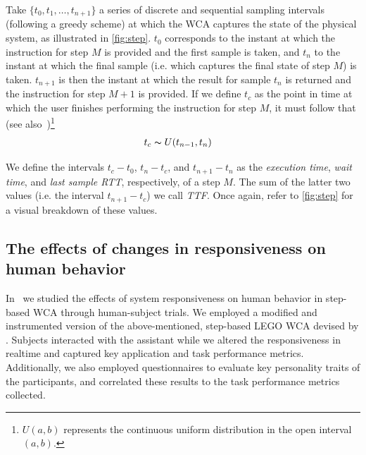 
Take \( \{ t_0, t_1, \ldots, t_{n + 1} \} \) a series of discrete and sequential sampling intervals (following a greedy scheme) at which the \ac{WCA} captures the state of the physical system, as illustrated in \cref{fig:step}.
\( t_0 \) corresponds to the instant at which the instruction for step \( M \) is provided and the first sample is taken, and \( t_n \) to the instant at which the final sample (i.e. which captures the final state of step \( M \)) is taken. 
\( t_{n + 1} \) is then the instant at which the result for sample \( t_n \) is returned and the instruction for step \( M + 1 \) is provided.
If we define \( t_c \) as the point in time at which the user finishes performing the instruction for step \( M \), it must follow that (see also~\cite{olguinmunoz:impact2021})\footnote{\( U(a, b) \) represents the continuous uniform distribution in the open interval \( (a, b) \).}
\begin{align}\label{eq:tc}
    t_c &\thicksim U(t_{n - 1}, t_n)
\end{align}


We define the intervals \( t_c - t_0 \), \( t_n - t_c \), and \( t_{n + 1} - t_n \) as the \emph{execution time}, \emph{wait time}, and \emph{last sample \ac{RTT}}, respectively, of a step \( M \).
The sum of the latter two values (i.e. the interval \( t_{n + 1} - t_c \)) we call \emph{\ac{TTF}}.
Once again, refer to \cref{fig:step} for a visual breakdown of these values.

\subsection{The effects of changes in responsiveness on human behavior}\label{ssec:plos}

In~\cite{olguinmunoz:impact2021} we studied the effects of system responsiveness on human behavior in step-based \ac{WCA} through human-subject trials.
We employed a modified and instrumented version of the above-mentioned, step-based LEGO \ac{WCA} devised by \textcite{Chen2015LEGO}.
Subjects interacted with the assistant while we altered the responsiveness in realtime and captured key application and task performance metrics.
Additionally, we also employed questionnaires to evaluate key personality traits of the participants, and correlated these results to the task performance metrics collected.


